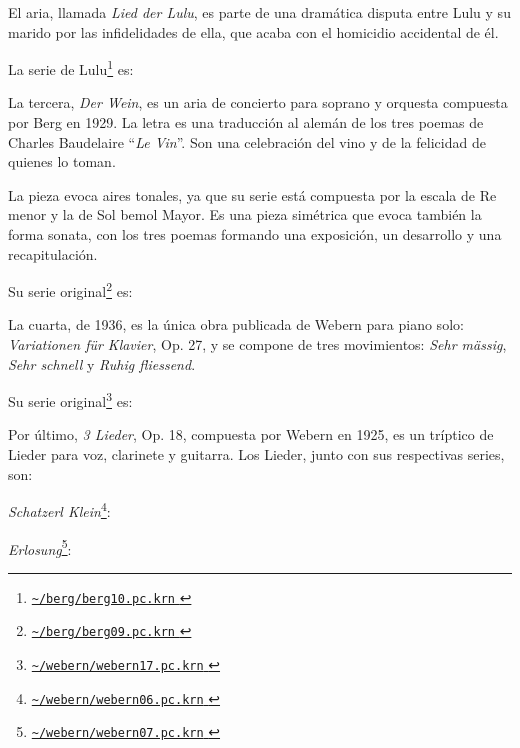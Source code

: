 	El aria, llamada \textit{Lied der Lulu}, es parte de una dramática disputa entre Lulu y su marido por las infidelidades de ella, que acaba con el homicidio accidental de él.
	
	{La serie de Lulu\footnote{\href{http://www.ccarh.org/publications/data/humdrum/tonerow/files/berg/berg10.pc.krn}{ \texttt{\textasciitilde/berg/berg10.pc.krn} }} es:
		}
	
	La tercera, \textit{Der Wein}, es un aria de concierto para soprano y orquesta compuesta por Berg en 1929. La letra es una traducción al alemán de los tres poemas de Charles Baudelaire ``\textit{Le Vin}''. Son una celebración del vino y de la felicidad de quienes lo toman.
	
	La pieza evoca aires tonales, ya que su serie está compuesta por la escala de Re menor y la de Sol bemol Mayor. Es una pieza simétrica que evoca también la forma sonata, con los tres poemas formando una exposición, un desarrollo y una recapitulación.
	
	{Su serie original\footnote{\href{http://www.ccarh.org/publications/data/humdrum/tonerow/files/berg/berg09.pc.krn}{ \texttt{\textasciitilde/berg/berg09.pc.krn} }} es:        	
		}
	
	La cuarta, de 1936, es la única obra publicada de Webern para piano solo: \textit{Variationen für Klavier}, Op. 27, y se compone de tres movimientos: \textit{Sehr mässig}, \textit{Sehr schnell} y \textit{Ruhig fliessend}.
	
	{Su serie original\footnote{\href{http://www.ccarh.org/publications/data/humdrum/tonerow/files/webern/webern17.pc.krn}{ \texttt{\textasciitilde/webern/webern17.pc.krn} }} es:
		}
	
	Por último, \textit{3 Lieder}, Op. 18, compuesta por Webern en 1925, es un tríptico de Lieder para voz, clarinete y guitarra. Los Lieder, junto con sus respectivas series, son:
	
	\textit{Schatzerl Klein}\footnote{\href{http://www.ccarh.org/publications/data/humdrum/tonerow/files/webern/webern06.pc.krn}{ \texttt{\textasciitilde/webern/webern06.pc.krn} }}: \hfill
	
	\textit{Erlosung}\footnote{\href{http://www.ccarh.org/publications/data/humdrum/tonerow/files/webern/webern07.pc.krn}{ \texttt{\textasciitilde/webern/webern07.pc.krn} }}: \hfill
	
    
